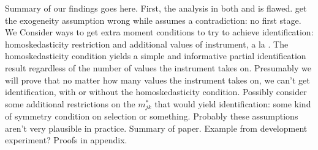 Summary of our findings goes here. 
First, the analysis in both \cite{FL} and \cite{Mahajan} is flawed.
\cite{FL} get the exogeneity assumption wrong while \cite{Mahajan} assumes a contradiction: no first stage.
We Consider ways to get extra moment conditions to try to achieve identification: homoskedasticity restriction and additional values of instrument, a la \cite{Lewbel}.
The homoskedasticity condition yields a simple and informative partial identification result regardless of the number of values the instrument takes on.
Presumably we will prove that no matter how many values the instrument takes on, we can't get identification, with or without the homoskedasticity condition.
Possibly consider some additional restrictions on the $m^*_{jk}$ that would yield identification: some kind of symmetry condition on selection or something.
Probably these assumptions aren't very plausible in practice.
Summary of paper.
Example from development experiment?
Proofs in appendix.
